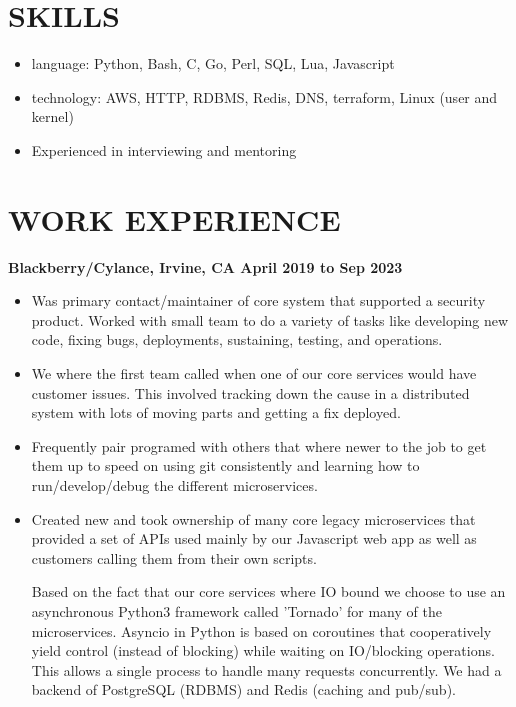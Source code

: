 \documentclass{res}
\begin{document}

\address{john@jjdev.com - (657) 400 9422 - Westminster, CA 92683}

\begin{resume}
  \section{SKILLS}

  \begin{itemize}

  \item
    language: Python, Bash, C, Go, Perl, SQL, Lua, Javascript
  \item
      technology: AWS, HTTP, RDBMS, Redis, DNS, terraform, Linux (user and kernel)
  \item
      Experienced in interviewing and mentoring
  \end{itemize}

  \section{WORK EXPERIENCE}

  {\large \bf Blackberry/Cylance, Irvine, CA \hfill April 2019 to Sep 2023}
  \begin{itemize}
  \item
    Was primary contact/maintainer of core system that supported a
    security product.  Worked with small team to do a variety of tasks
    like developing new code, fixing bugs, deployments, sustaining,
    testing, and operations.

  \item
    We where the first team called when one of our core services would
    have customer issues. This involved tracking down the cause in
    a distributed system with lots of moving parts and getting a fix
    deployed.

  \item
    Frequently pair programed with others that where newer to the job
    to get them up to speed on using git consistently and learning how
    to run/develop/debug the different microservices.

  \item
Created new and took ownership of many core legacy microservices that
provided a set of APIs used mainly by our Javascript web app as well as
customers calling them from their own scripts.

Based on the fact that our core services where IO bound we choose
to use an asynchronous Python3 framework called 'Tornado' for many
of the microservices. Asyncio in Python is based on coroutines that
cooperatively yield control (instead of blocking) while waiting on
IO/blocking operations. This allows a single process to handle many
requests concurrently.  We had a backend of PostgreSQL (RDBMS) and Redis
(caching and pub/sub).


\end{itemize}
\end{resume}
\end{document}
